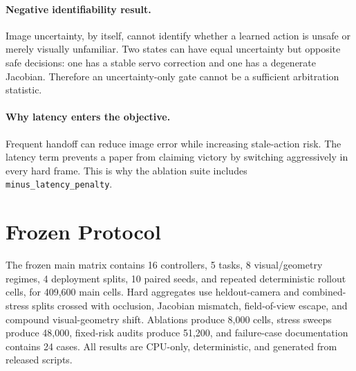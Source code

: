 \documentclass{article}
\begin{document}
\paragraph{Negative identifiability result.} Image uncertainty, by itself, cannot identify whether a learned action is unsafe or merely visually unfamiliar. Two states can have equal uncertainty but opposite safe decisions: one has a stable servo correction and one has a degenerate Jacobian. Therefore an uncertainty-only gate cannot be a sufficient arbitration statistic.
\paragraph{Why latency enters the objective.} Frequent handoff can reduce image error while increasing stale-action risk. The latency term prevents a paper from claiming victory by switching aggressively in every hard frame. This is why the ablation suite includes \texttt{minus\_latency\_penalty}.
\section{Frozen Protocol}
The frozen main matrix contains 16 controllers, 5 tasks, 8 visual/geometry regimes, 4 deployment splits, 10 paired seeds, and repeated deterministic rollout cells, for 409,600 main cells. Hard aggregates use heldout-camera and combined-stress splits crossed with occlusion, Jacobian mismatch, field-of-view escape, and compound visual-geometry shift. Ablations produce 8,000 cells, stress sweeps produce 48,000, fixed-risk audits produce 51,200, and failure-case documentation contains 24 cases. All results are CPU-only, deterministic, and generated from released scripts.
\begin{table}[t]\centering\small\resizebox{\linewidth}{!}{}\caption{Frozen local gates. The external scope gate is separate and fails.}\label{tab:gates}\end{table}
\end{document}
